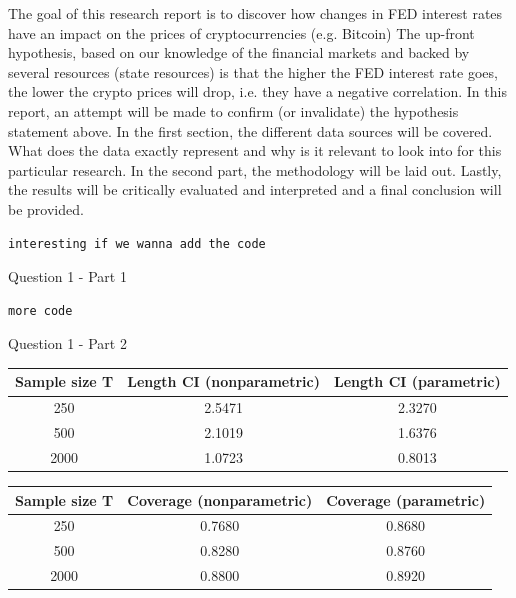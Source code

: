 \documentclass[12pt]{article}
\begin{document}
The goal of this research report is to discover how changes in FED interest rates have an impact on the prices of cryptocurrencies (e.g. Bitcoin) \newline
The up-front hypothesis, based on our knowledge of the financial markets and backed by several resources (state resources) is that the higher the FED interest rate goes, the lower the crypto prices will drop, i.e. they have a negative correlation. In this report, an attempt will be made to  confirm (or invalidate) the hypothesis statement above. \newline
In the first section, the different data sources will be covered. What does the data exactly represent and why is it relevant to look into for this particular research. In the second part, the methodology will be laid out. Lastly, the results will be critically evaluated and interpreted and a final conclusion will be provided. 


\begin{Program}[!htb]
\begin{lstlisting}[style=Matlab-editor,basicstyle=\mlttfamily\footnotesize]
interesting if we wanna add the code 
\end{lstlisting}
\caption{Question 1 - Part 1}
\label{Question 1 - Part 1}
\end{Program}

\begin{Program}[!htb]
\begin{lstlisting}[style=Matlab-editor,basicstyle=\mlttfamily\footnotesize]
more code 
\end{lstlisting}
\caption{Question 1 - Part 2}
\label{Question 1 - Part 2}
\end{Program}


\begin{center}
\begin{tabular}{||c | c c||} 
 \hline
 Sample size T & Length CI (nonparametric) & Length CI (parametric) \\ [0.5ex] 
 \hline\hline
 250 & 2.5471 & 2.3270 \\ 
 \hline
 500 & 2.1019 & 1.6376 \\
 \hline
 2000 & 1.0723 & 0.8013 \\ [1ex] 
 \hline
\end{tabular}
\end{center}
\vspace{3pt}
\begin{center}
\begin{tabular}{||c | c c||} 
 \hline
 Sample size T & Coverage (nonparametric) & Coverage (parametric) \\ [0.5ex] 
 \hline\hline
 250 & 0.7680 & 0.8680 \\ 
 \hline
 500 & 0.8280 & 0.8760 \\
 \hline
 2000 & 0.8800 & 0.8920 \\ [1ex] 
 \hline
\end{tabular}
\end{center}
\vspace{15pt}
\end{document}
